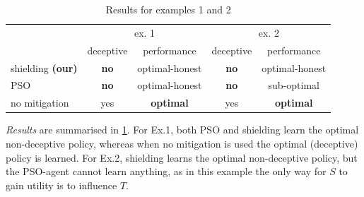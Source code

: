 \documentclass[submission,publicdomain,creativecommons noncommercial]{eptcs}
\begin{document}
\begin{table} 
\vspace{-6mm}
\centering
    \caption{Results for examples 1 and 2} \vspace{-3mm}
    \begin{tabular}{l c c c c}
        \hline
        & \multicolumn{2}{c}{ex. 1} & \multicolumn{2}{c}{ex. 2} \\
        & deceptive &  performance & deceptive & performance \\
        \hline
        shielding \textbf{(our)} & \textbf{no} & optimal-honest & \textbf{no} & optimal-honest \\
        PSO & \textbf{no} & optimal-honest & \textbf{no} & sub-optimal \\
        no mitigation & yes & \textbf{optimal} & yes & \textbf{optimal} \\
        \hline
    \end{tabular} \label{tab:results}
\end{table} 


\emph{Results} are summarised in \cref{tab:results}. For Ex.1, both PSO and shielding learn the optimal non-deceptive policy, whereas when no mitigation is used the optimal (deceptive) policy is learned. For Ex.2, shielding learns the optimal non-deceptive policy, but the PSO-agent cannot learn anything, as in this example the only way for $S$ to gain utility is to influence $T$. %
\end{document}
